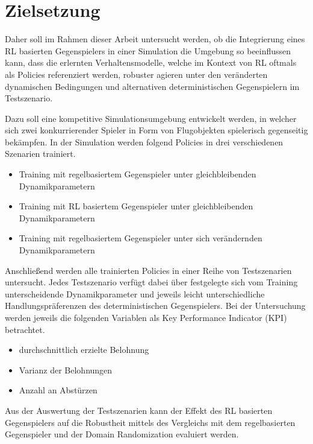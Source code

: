 \section{Zielsetzung}

Daher soll im Rahmen dieser Arbeit untersucht werden, ob die Integrierung eines RL basierten Gegenspielers in einer Simulation die Umgebung so beeinflussen kann, dass die erlernten Verhaltensmodelle, welche im Kontext von RL oftmals als Policies referenziert werden, robuster agieren unter den veränderten dynamischen Bedingungen und alternativen deterministischen Gegenspielern im Testszenario. 

Dazu soll eine kompetitive Simulationsumgebung entwickelt werden, in welcher sich zwei konkurrierender Spieler in Form von Flugobjekten spielerisch gegenseitig bekämpfen.
In der Simulation werden folgend Policies in drei verschiedenen Szenarien trainiert.
\begin{itemize}
    \item Training mit regelbasiertem Gegenspieler unter gleichbleibenden Dynamikparametern
    \item Training mit RL basiertem Gegenspieler unter gleichbleibenden Dynamikparametern
    \item Training mit regelbasiertem Gegenspieler unter sich verändernden Dynamikparametern
\end{itemize}

Anschließend werden alle trainierten Policies in einer Reihe von Testszenarien untersucht.
Jedes Testszenario verfügt dabei über festgelegte sich vom Training unterscheidende Dynamikparameter und jeweils leicht unterschiedliche Handlungspräferenzen des deterministischen Gegenspielers.
Bei der Untersuchung werden jeweils die folgenden Variablen als Key Performance Indicator (KPI) betrachtet.
\begin{itemize}
    \item durchschnittlich erzielte Belohnung
    \item Varianz der Belohnungen
    \item Anzahl an Abstürzen
\end{itemize}

Aus der Auswertung der Testszenarien kann der Effekt des RL basierten Gegenspielers auf die Robustheit mittels des Vergleichs mit dem regelbasierten Gegenspieler und der Domain Randomization evaluiert werden.


